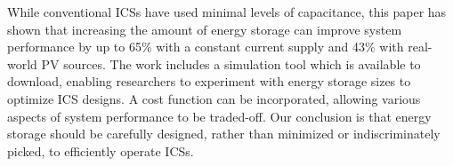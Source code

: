 \documentclass[journal, twoside]{IEEEtran}
\begin{document}
While conventional ICSs have used minimal levels of capacitance, this paper has shown that increasing the amount of energy storage can improve system performance by up to 65\% with a constant current supply and 43\% with real-world PV sources. The work includes a simulation tool which is available to download, enabling researchers to experiment with energy storage sizes to optimize ICS designs. A cost function can be incorporated, allowing various aspects of system performance to be traded-off. Our conclusion is that energy storage should be carefully designed, rather than minimized or indiscriminately picked, to efficiently operate ICSs.


%
%
\end{document}
